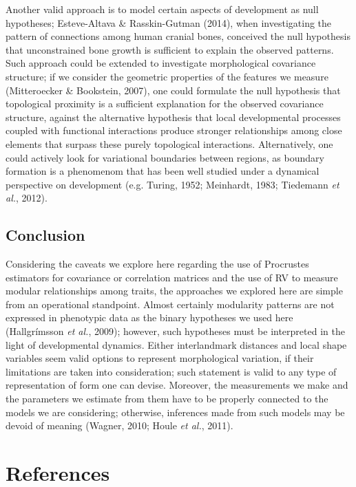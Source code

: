 \documentclass[12pt,]{article}
\begin{document}
Another valid approach is to model certain aspects of development as
null hypotheses; Esteve-Altava \& Rasskin-Gutman (2014), when
investigating the pattern of connections among human cranial bones,
conceived the null hypothesis that unconstrained bone growth is
sufficient to explain the observed patterns. Such approach could be
extended to investigate morphological covariance structure; if we
consider the geometric properties of the features we measure
(Mitteroecker \& Bookstein, 2007), one could formulate the null
hypothesis that topological proximity is a sufficient explanation for
the observed covariance structure, against the alternative hypothesis
that local developmental processes coupled with functional interactions
produce stronger relationships among close elements that surpass these
purely topological interactions. Alternatively, one could actively look
for variational boundaries between regions, as boundary formation is a
phenomenom that has been well studied under a dynamical perspective on
development (e.g. Turing, 1952; Meinhardt, 1983; Tiedemann \emph{et
al.}, 2012).

\subsection{Conclusion}\label{conclusion}

Considering the caveats we explore here regarding the use of Procrustes
estimators for covariance or correlation matrices and the use of RV to
measure modular relationships among traits, the approaches we explored
here are simple from an operational standpoint. Almost certainly
modularity patterns are not expressed in phenotypic data as the binary
hypotheses we used here (Hallgrímsson \emph{et al.}, 2009); however,
such hypotheses must be interpreted in the light of developmental
dynamics. Either interlandmark distances and local shape variables seem
valid options to represent morphological variation, if their limitations
are taken into consideration; such statement is valid to any type of
representation of form one can devise. Moreover, the measurements we
make and the parameters we estimate from them have to be properly
connected to the models we are considering; otherwise, inferences made
from such models may be devoid of meaning (Wagner, 2010; Houle \emph{et
al.}, 2011).

\section*{References}\label{references}
\end{document}
